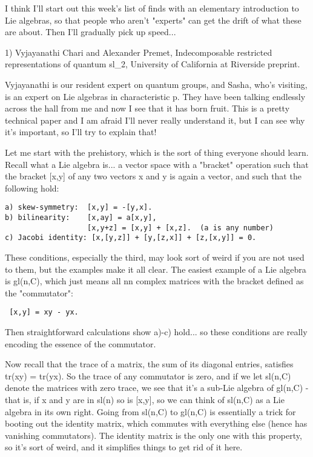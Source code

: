 

I think I'll start out this week's list of finds with an elementary
introduction to Lie algebras, so that people who aren't "experts" can
get the drift of what these are about.  Then I'll gradually pick up
speed...

1) Vyjayanathi Chari and Alexander Premet, Indecomposable restricted
representations of quantum sl_{2}, University of California at
Riverside preprint.

Vyjayanathi is our resident expert on quantum groups, and Sasha, who's
visiting, is an expert on Lie algebras in characteristic p.  They have
been talking endlessly across the hall from me and now I see that it has
born fruit.  This is a pretty technical paper and I am afraid I'll never
really understand it, but I can see why it's important, so I'll try to 
explain that!  

Let me start with the prehistory, which is the sort of thing everyone
should learn.  Recall what a Lie algebra is... a vector space
with a "bracket" operation such that the bracket [x,y] of any two vectors
x and y is again a vector, and such that the following hold:

\begin{verbatim}
a) skew-symmetry:  [x,y] = -[y,x].
b) bilinearity:    [x,ay] = a[x,y],  
                   [x,y+z] = [x,y] + [x,z].  (a is any number) 
c) Jacobi identity: [x,[y,z]] + [y,[z,x]] + [z,[x,y]] = 0.
\end{verbatim}
    

These conditions, especially the third, may look sort of weird if you
are not used to them, but the examples make it all clear.  The easiest
example of a Lie algebra is gl(n,C), which just means all n\times n complex
matrices with the bracket defined as the "commutator":

\begin{verbatim}
 [x,y] = xy - yx.  
\end{verbatim}
    

Then straightforward calculations show a)-c) hold... so these conditions
are really encoding the essence of the commutator.  

Now recall that the trace of a matrix, the sum of its diagonal entries,
satisfies tr(xy) = tr(yx).  So the trace of any commutator is zero, and
if we let sl(n,C) denote the matrices with zero trace, we see that it's a
sub-Lie algebra of gl(n,C) - that is, if x and y are in sl(n) so is [x,y],
so we can think of sl(n,C) as a Lie algebra in its own right.  Going from
sl(n,C) to gl(n,C) is essentially a trick for booting out the identity
matrix, which commutes with everything else (hence has vanishing
commutators).  The identity matrix is the only one with this property,
so it's sort of weird, and it simplifies things to get rid of it here.  

